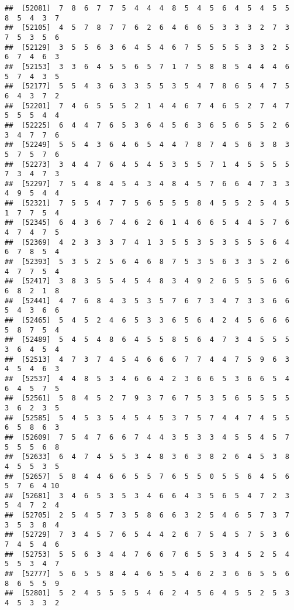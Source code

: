 \documentclass[
]{book}
\begin{document}
\begin{verbatim}
##  [52081]  7  8  6  7  7  5  4  4  4  8  5  4  5  6  4  5  4  5  5  8  5  4  3  7
##  [52105]  4  5  7  8  7  7  6  2  6  4  6  6  5  3  3  3  2  7  3  7  5  3  5  6
##  [52129]  3  5  5  6  3  6  4  5  4  6  7  5  5  5  5  3  3  2  5  6  7  4  6  3
##  [52153]  3  3  6  4  5  5  6  5  7  1  7  5  8  8  5  4  4  4  6  5  7  4  3  5
##  [52177]  5  5  4  3  6  3  3  5  5  3  5  4  7  8  6  5  4  7  5  6  4  3  7  2
##  [52201]  7  4  6  5  5  5  2  1  4  4  6  7  4  6  5  2  7  4  7  5  5  5  4  4
##  [52225]  6  4  4  7  6  5  3  6  4  5  6  3  6  5  6  5  5  2  6  3  4  7  7  6
##  [52249]  5  5  4  3  6  4  6  5  4  4  7  8  7  4  5  6  3  8  3  5  7  5  7  6
##  [52273]  3  4  4  7  6  4  5  4  5  3  5  5  7  1  4  5  5  5  5  7  3  4  7  3
##  [52297]  7  5  4  8  4  5  4  3  4  8  4  5  7  6  6  4  7  3  3  4  9  5  4  4
##  [52321]  7  5  5  4  7  7  5  6  5  5  5  8  4  5  5  2  5  4  5  1  7  7  5  4
##  [52345]  6  4  3  6  7  4  6  2  6  1  4  6  6  5  4  4  5  7  6  4  7  4  7  5
##  [52369]  4  2  3  3  3  7  4  1  3  5  5  3  5  3  5  5  5  6  4  6  7  8  5  4
##  [52393]  5  3  5  2  5  6  4  6  8  7  5  3  5  6  3  3  5  2  6  4  7  7  5  4
##  [52417]  3  8  3  5  5  4  5  4  8  3  4  9  2  6  5  5  5  6  6  6  8  2  1  8
##  [52441]  4  7  6  8  4  3  5  3  5  7  6  7  3  4  7  3  3  6  6  5  4  3  6  6
##  [52465]  5  4  5  2  4  6  5  3  3  6  5  6  4  2  4  5  6  6  6  5  8  7  5  4
##  [52489]  5  4  5  4  8  6  4  5  5  8  5  6  4  7  3  4  5  5  5  3  6  4  5  4
##  [52513]  4  7  3  7  4  5  4  6  6  6  7  7  4  4  7  5  9  6  3  4  5  4  6  3
##  [52537]  4  4  8  5  3  4  6  6  4  2  3  6  6  5  3  6  6  5  4  6  4  5  7  5
##  [52561]  5  8  4  5  2  7  9  3  7  6  7  5  3  5  6  5  5  5  5  3  6  2  3  5
##  [52585]  5  4  5  3  5  4  5  4  5  3  7  5  7  4  4  7  4  5  5  6  5  8  6  3
##  [52609]  7  5  4  7  6  6  7  4  4  3  5  3  3  4  5  5  4  5  7  5  5  5  6  8
##  [52633]  6  4  7  4  5  5  3  4  8  3  6  3  8  2  6  4  5  3  8  4  5  5  3  5
##  [52657]  5  8  4  4  6  6  5  5  7  6  5  5  0  5  5  6  4  5  6  5  7  6  4 10
##  [52681]  3  4  6  5  3  5  3  4  6  6  4  3  5  6  5  4  7  2  3  5  4  7  2  4
##  [52705]  2  5  4  5  7  3  5  8  6  6  3  2  5  4  6  5  7  3  7  3  5  3  8  4
##  [52729]  7  3  4  5  7  6  5  4  4  2  6  7  5  4  5  7  5  3  6  7  4  5  4  6
##  [52753]  5  5  6  3  4  4  7  6  6  7  6  5  5  3  4  5  2  5  4  5  5  3  4  7
##  [52777]  5  6  5  5  8  4  4  6  5  5  4  6  2  3  6  6  5  5  6  8  6  5  5  9
##  [52801]  5  2  4  5  5  5  5  4  6  2  4  5  6  4  5  5  2  5  3  4  5  3  3  2

\end{verbatim}
\end{document}
